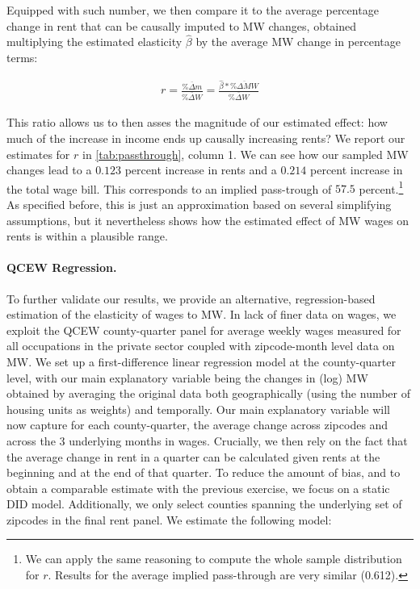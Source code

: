 Equipped with such number, we then compare it to the average percentage change in rent that 
can be causally imputed to MW changes, obtained multiplying the estimated elasticity $\hat{\beta}$ 
by the average MW change in percentage terms: 

\begin{align}
	r = \frac{\overline{\% \Delta m}}{\overline{\% \Delta W}} = \frac{\hat{\beta}*\overline{\% \Delta MW}}{\overline{\% \Delta W}} 
\end{align}

This ratio allows us to then asses the magnitude of our estimated effect: how much of the 
increase in income ends up causally increasing rents? We report our estimates for $r$ in 
\autoref{tab:passthrough}, column 1. We can see how our sampled MW changes lead to a $0.123$ 
percent increase in rents and a $0.214$ percent increase in the total wage bill. This corresponds 
to an implied pass-trough of $57.5$ percent.\footnote{We can apply the same reasoning to compute 
	the whole sample distribution for $r$. Results for the average implied pass-through are very similar (0.612).}
As specified before, this is just an approximation based on several simplifying assumptions, but it 
nevertheless shows how the estimated effect of MW wages on rents is within a plausible range. 

\paragraph{QCEW Regression.} To further validate our results, we provide an alternative, 
regression-based estimation of the elasticity of wages to MW. In lack of finer data on wages, 
we exploit the QCEW county-quarter panel for average weekly wages measured for all occupations 
in the private sector coupled with zipcode-month level data on MW. We set up a first-difference 
linear regression model at the county-quarter level, with our main explanatory variable being the 
changes in (log) MW obtained by averaging the original data both geographically (using the 
number of housing units as weights) and temporally. Our main explanatory variable will now capture 
for each county-quarter, the average change across zipcodes and across the 3 underlying months 
in wages. Crucially, we then rely on the fact that the average change in rent in a quarter can be calculated 
given rents at the beginning and at the end of that quarter. To reduce the amount of bias, and to obtain 
a comparable estimate with the previous exercise, we focus on a static DID model. Additionally, we only 
select counties spanning the underlying set of zipcodes in the final rent panel. We estimate the following model: 

